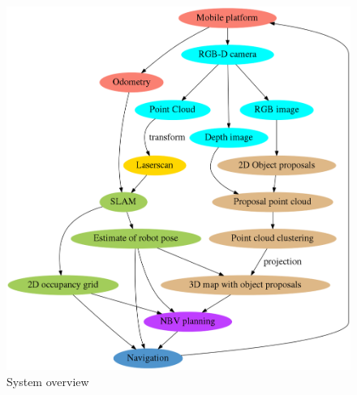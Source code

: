 
\begin{figure}
\includegraphics[width=0.9\linewidth]{dot/overview.png}
\caption{System overview}
\label{fig:system_overview}
\end{figure}